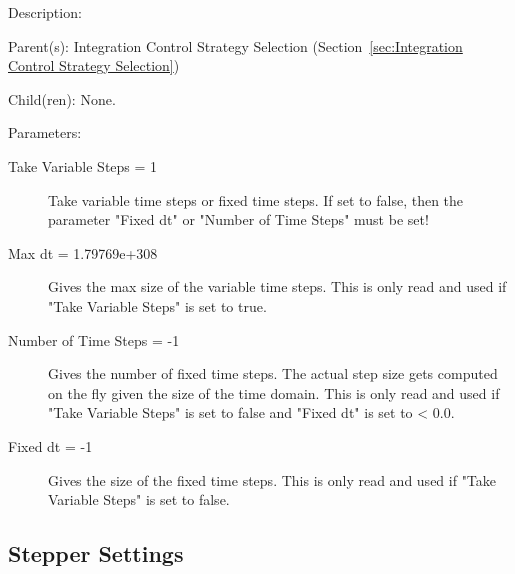 \begin{list}{}
  {\setlength{\leftmargin}{1.0in}
   \setlength{\labelwidth}{0.75in}
   \setlength{\labelsep}{0.125in}}
  \item[Description:]
  \item[Parent(s):]
    Integration Control Strategy Selection (Section~\ref{sec:Integration Control Strategy Selection})
  \item[Child(ren):]
    None. 
  \item[Parameters:]
    \begin{description}
      \item[Take Variable Steps = 1] 
Take variable time steps or fixed time steps.
If set to false, then the parameter "Fixed dt"
or "Number of Time Steps" must be set!
      \item[Max dt = 1.79769e+308] 
Gives the max size of the variable time steps.  This is only read and used if
"Take Variable Steps" is set to true.
      \item[Number of Time Steps = -1] 
Gives the number of fixed time steps.  The actual step size gets computed
on the fly given the size of the time domain.
This is only read and used if "Take Variable Steps" is set to false
and "Fixed dt" is set to < 0.0.
      \item[Fixed dt = -1] 
Gives the size of the fixed time steps.  This is only read and used if
"Take Variable Steps" is set to false.
\end{description}

\end{list}

\subsection{Stepper Settings}
\label{sec:Stepper Settings}

